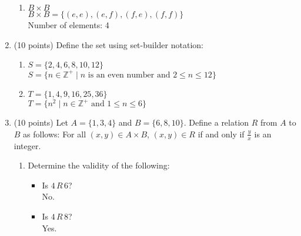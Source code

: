 \documentclass{article}
\begin{document}
\begin{enumerate}
\begin{enumerate}
        \item $B \times B$\\
        \vspace{1em}
        $B \times B = \{(e, e), (e, f), (f, e), (f, f)\}$\\
        Number of elements: 4
        \vspace{1em}
    \end{enumerate}
    
    \hrulefill

    \item (10 points) Define the set using set-builder notation:
    \begin{enumerate}
        \item $S = \{2, 4, 6, 8, 10, 12\}$\\
        \vspace{1em}
        $S = \{n \in \mathbb{Z}^+ \mid n \text{ is an even number and } 2 \leq n \leq 12\}$
        \vspace{1em}
        
        \hrulefill

        \item $T = \{1, 4, 9, 16, 25, 36\}$\\
        \vspace{1em}
        $T = \{n^2 \mid n \in \mathbb{Z}^+ \text{ and } 1 \leq n \leq 6\}$
        \vspace{1em}
    \end{enumerate}
    
    \hrulefill

    \item (10 points) Let $A = \{1, 3, 4\}$ and $B = \{6, 8, 10\}$. Define a relation $R$ from $A$ to $B$ as follows:
    For all $(x, y) \in A \times B$, $(x, y) \in R$ if and only if $\frac{y}{x}$ is an integer.
    \begin{enumerate}
        \item Determine the validity of the following:
        \begin{itemize}
            \item Is $4 \,R\, 6$?\\
            \vspace{1em}
            No.
            \vspace{1em}
            
            \hrulefill

            \item Is $4 \,R\, 8$?\\
            \vspace{1em}
            Yes.
            \vspace{1em}
            

\end{itemize}
\end{enumerate}
\end{enumerate}
\end{document}
